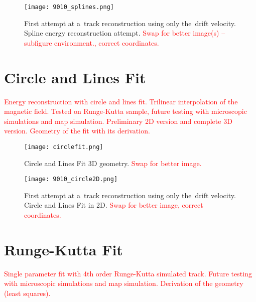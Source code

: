 		\begin{figure}
			\centering
			\texttt{[image: 9010\_splines.png]}
			\caption{First attempt at a~track reconstruction using only the~drift velocity. Spline energy reconstruction attempt. \textcolor{red}{Swap for better image(s) -- subfigure environment., correct coordinates.}}
			\label{fig:9010splines}
		\end{figure}
	
	\section{Circle and Lines Fit}
	\label{sec:clines}
		\textcolor{red}{Energy reconstruction with circle and lines fit. Trilinear interpolation of the magnetic field. Tested on Runge-Kutta sample, future testing with microscopic simulations and map simulation. Preliminary 2D version and complete 3D version. Geometry of the fit with its derivation.}
		
		\begin{figure}
			\centering
			\texttt{[image: circlefit.png]}
			\caption{Circle and Lines Fit 3D geometry. \textcolor{red}{Swap for better image.}}
			\label{fig:circlefit}
		\end{figure}
		
		\begin{figure}
			\centering
			\texttt{[image: 9010\_circle2D.png]}
			\caption{First attempt at a~track reconstruction using only the~drift velocity. Circle and Lines Fit in 2D. \textcolor{red}{Swap for better image, correct coordinates.}}
			\label{fig:9010circle2D}
		\end{figure}
	
	\section{Runge-Kutta Fit}
		\textcolor{red}{Single parameter fit with 4th order Runge-Kutta simulated track. Future testing with microscopic simulations and map simulation. Derivation of the geometry (least squares).}